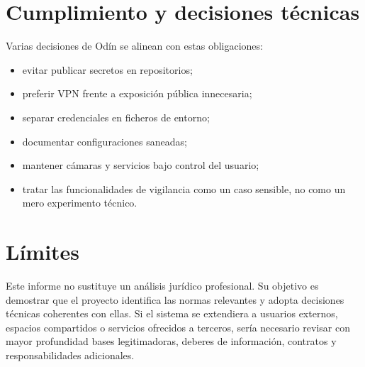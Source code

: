\section{Cumplimiento y decisiones técnicas}
Varias decisiones de Odín se alinean con estas obligaciones:
\begin{itemize}
  \item evitar publicar secretos en repositorios;
  \item preferir VPN frente a exposición pública innecesaria;
  \item separar credenciales en ficheros de entorno;
  \item documentar configuraciones saneadas;
  \item mantener cámaras y servicios bajo control del usuario;
  \item tratar las funcionalidades de vigilancia como un caso sensible, no como un mero experimento técnico.
\end{itemize}

\section{Límites}
Este informe no sustituye un análisis jurídico profesional. Su objetivo es demostrar que el proyecto identifica las normas relevantes y adopta decisiones técnicas coherentes con ellas. Si el sistema se extendiera a usuarios externos, espacios compartidos o servicios ofrecidos a terceros, sería necesario revisar con mayor profundidad bases legitimadoras, deberes de información, contratos y responsabilidades adicionales.
